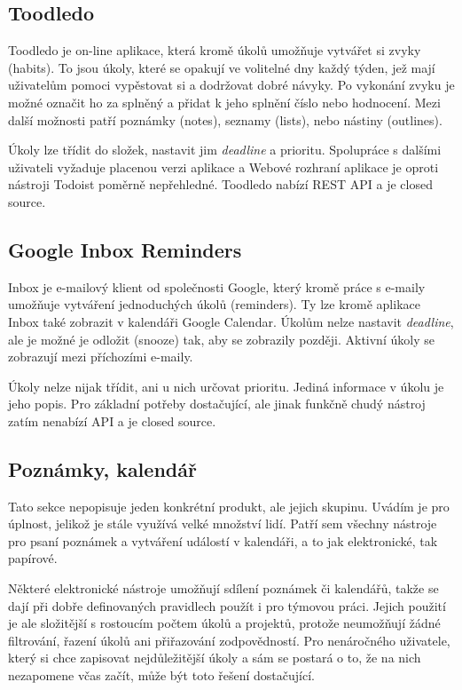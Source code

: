 \documentclass[thesis=B,czech]{FITthesis}[2012/06/26]
\begin{document}
		\subsection{Toodledo}
			Toodledo \cite{toodledo} je on-line aplikace, která kromě úkolů umožňuje vytvářet si zvyky (habits). To jsou úkoly, které se opakují ve volitelné dny každý týden, jež mají uživatelům pomoci vypěstovat si a dodržovat dobré návyky. Po vykonání zvyku je možné označit ho za splněný a přidat k jeho splnění číslo nebo hodnocení. Mezi další možnosti patří poznámky (notes), seznamy (lists), nebo nástiny (outlines). 
			
			Úkoly lze třídit do složek, nastavit jim \textit{deadline} a prioritu. Spolupráce s dalšími uživateli vyžaduje placenou verzi aplikace a Webové rozhraní aplikace je oproti nástroji Todoist poměrně nepřehledné. Toodledo nabízí REST API\cite{toodledo-api} a je closed source.
			
		\subsection{Google Inbox Reminders}
			Inbox \cite{ginbox} je e-mailový klient od společnosti Google, který kromě práce s e-maily umožňuje vytváření jednoduchých úkolů (reminders). Ty lze kromě aplikace Inbox také zobrazit v kalendáři Google Calendar.\cite{gcal} Úkolům nelze nastavit \textit{deadline}, ale je možné je odložit (snooze) tak, aby se zobrazily později. Aktivní úkoly se zobrazují mezi příchozími e-maily.
			
			Úkoly nelze nijak třídit, ani u nich určovat prioritu. Jediná informace v úkolu je jeho popis. Pro základní potřeby dostačující, ale jinak funkčně chudý nástroj zatím nenabízí API\cite{ginbox-no-api} a je closed source.
			
			
			
		\subsection{Poznámky, kalendář}
			Tato sekce nepopisuje jeden konkrétní produkt, ale jejich skupinu. Uvádím je pro úplnost, jelikož je stále využívá velké množství lidí. Patří sem všechny nástroje pro psaní poznámek a vytváření událostí v kalendáři, a to jak elektronické, tak papírové. 
			
			Některé elektronické nástroje umožňují sdílení poznámek či kalendářů, takže se dají při dobře definovaných pravidlech použít i pro týmovou práci. Jejich použití je ale složitější s rostoucím počtem úkolů a projektů, protože neumožňují žádné filtrování, řazení úkolů ani přiřazování zodpovědností. Pro nenáročného uživatele, který si chce zapisovat nejdůležitější úkoly a sám se postará o to, že na nich nezapomene včas začít, může být toto řešení dostačující.
			
\end{document}
